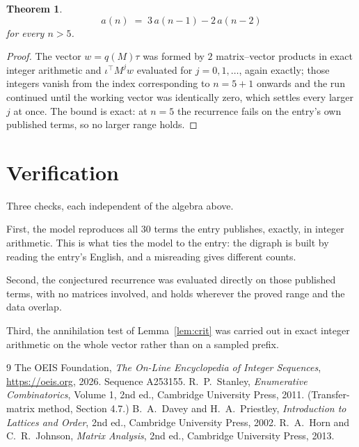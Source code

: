\documentclass[11pt,a4paper]{article}
\theoremstyle{plain}
\newtheorem{theorem}{Theorem}
\theoremstyle{definition}
\begin{document}
\begin{theorem}
\[
a(n)\;=\;3\,a(n-1) - 2\,a(n-2)
\]
for every $n>5$.
\end{theorem}

\begin{proof}
The vector $w=q(M)\tau$ was formed by $2$ matrix--vector products in exact integer
arithmetic and $\iota^{\!\top}M^{j}w$ evaluated for $j=0,1,\dots$, again exactly; those
integers vanish from the index corresponding to $n=5+1$ onwards and the run continued
until the working vector was identically zero, which settles every larger $j$ at once. The bound is exact: at $n=5$ the recurrence fails on the entry's own published terms, so no larger range holds.
\end{proof}

\section{Verification}

Three checks, each independent of the algebra above.

First, the model reproduces all $30$ terms the entry publishes, exactly, in integer
arithmetic. This is what ties the model to the entry: the digraph is built by reading the
entry's English, and a misreading gives different counts.

Second, the conjectured recurrence was evaluated directly on those published terms, with no
matrices involved, and holds wherever the proved range and the data overlap.

Third, the annihilation test of Lemma~\ref{lem:crit} was carried out in exact integer
arithmetic on the whole vector rather than on a sampled prefix.

\begin{thebibliography}{9}
 The OEIS Foundation, \emph{The On-Line Encyclopedia of Integer
Sequences}, \url{https://oeis.org}, 2026. Sequence A253155.
 R.~P.~Stanley, \emph{Enumerative Combinatorics}, Volume 1, 2nd ed.,
Cambridge University Press, 2011. (Transfer-matrix method, Section 4.7.)
 B.~A.~Davey and H.~A.~Priestley, \emph{Introduction to Lattices and
Order}, 2nd ed., Cambridge University Press, 2002.
 R.~A.~Horn and C.~R.~Johnson, \emph{Matrix Analysis}, 2nd ed., Cambridge
University Press, 2013.
\end{thebibliography}
\end{document}
